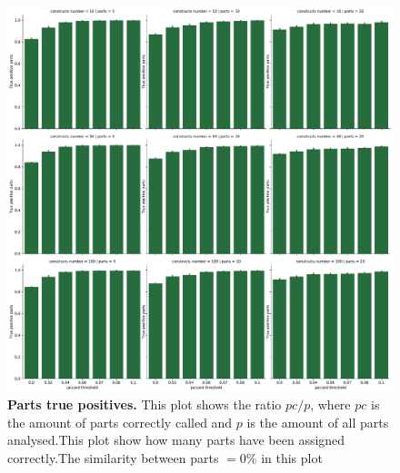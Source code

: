\documentclass[11pt, a4paper]{article}
\begin{document}
 \begin{figure}[ht]
    \begin{center}
    \includegraphics[width=1.35\textwidth]{../results/images_notebook/v_450/sim_00_parts_positive.pdf}
    \end{center}
    \caption{{\bf Parts true positives.}  This plot shows the ratio $pc/p$, where $pc$ is the amount of parts correctly called and $p$ is the amount of all parts analysed.This plot show how many parts have been assigned correctly.The similarity between parts $=0\%$ in this plot}
   \label{fig:v_sim_00_450_parts_positives }
\end{figure}
\end{document}

